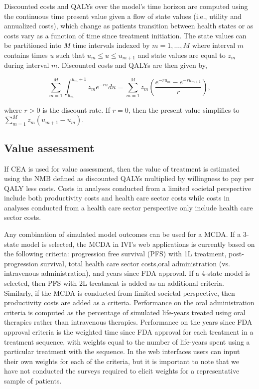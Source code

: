 \documentclass[11pt,final,fleqn]{article}\usepackage[]{graphicx}\usepackage[]{color}
\theoremstyle{plain}
\begin{document}
{Discounted costs and QALYs over the model's time horizon are computed using the continuous time present value given a flow of state values (i.e., utility and annualized costs), which change as patients transition between health states or as costs vary as a function of time since treatment initiation. The state values can be partitioned into $M$ time intervals indexed by $m = 1,\ldots, M$ where interval $m$ contains times $u$ such that $u_m\leq u \leq u_{m+1}$ and state values are equal to $z_m$ during interval $m$. Discounted costs and QALYs are then given by,  

\begin{equation} \label{eqn:pv}
\sum_{m = 1}^M \int_{u_m}^{u_m+1} z_me^{-ru}du = \sum_{m = 1}^M z_m \left(\frac{e^{-r{u_{m}}} - e^{-r{u_{m+1}}}}{r}\right),
\end{equation}

where $r > 0$ is the discount rate. If $r = 0$, then the present value simplifies to $\sum_{m = 1}^M z_m(u_{m+1} - u_{m})$. 

\subsection{Value assessment} \label{subsec:outcomes-value-assessment}
If CEA is used for value assessment, then the value of treatment is estimated using the NMB defined as discounted QALYs multiplied by willingness to pay per QALY less costs. Costs in analyses conducted from a limited societal perspective include both productivity costs and health care sector costs while costs in analyses conducted from a health care sector perspective only include health care sector costs. 

Any combination of simulated model outcomes can be used for a MCDA. If a 3-state model is selected, the MCDA in IVI's web applications is currently based on the following criteria: progression free survival (PFS) with 1L treatment, post-progression survival, total health care sector costs,oral administration (vs. intravenous administration), and years since FDA approval. If a 4-state model is selected, then PFS with 2L treatment is added as an additional criteria. Similarly, if the MCDA is conducted from limited societal perspective, then productivity costs are added as a criteria. Performance on the oral administration criteria is computed as the percentage of simulated life-years treated using oral therapies rather than intravenous therapies. Performance on the years since FDA approval criteria is the weighted time since FDA approval for each treatment in a treatment sequence, with weights equal to the number of life-years spent using a particular treatment with the sequence. In the web interfaces users can input their own weights for each of the criteria, but it is important to note that we have not conducted the surveys required to elicit weights for a representative sample of patients.

}
\end{document}
